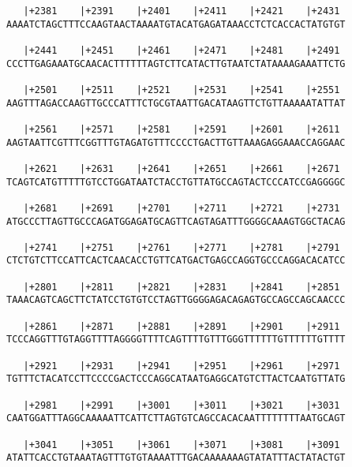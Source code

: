 \documentclass{article}
\begin{document}
\begin{Verbatim}
   |+2381    |+2391    |+2401    |+2411    |+2421    |+2431 
AAAATCTAGCTTTCCAAGTAACTAAAATGTACATGAGATAAACCTCTCACCACTATGTGT
                                                            
   |+2441    |+2451    |+2461    |+2471    |+2481    |+2491 
CCCTTGAGAAATGCAACACTTTTTTAGTCTTCATACTTGTAATCTATAAAAGAAATTCTG
                                                            
   |+2501    |+2511    |+2521    |+2531    |+2541    |+2551 
AAGTTTAGACCAAGTTGCCCATTTCTGCGTAATTGACATAAGTTCTGTTAAAAATATTAT
                                                            
   |+2561    |+2571    |+2581    |+2591    |+2601    |+2611 
AAGTAATTCGTTTCGGTTTGTAGATGTTTCCCCTGACTTGTTAAAGAGGAAACCAGGAAC
                                                            
   |+2621    |+2631    |+2641    |+2651    |+2661    |+2671 
TCAGTCATGTTTTTGTCCTGGATAATCTACCTGTTATGCCAGTACTCCCATCCGAGGGGC
                                                            
   |+2681    |+2691    |+2701    |+2711    |+2721    |+2731 
ATGCCCTTAGTTGCCCAGATGGAGATGCAGTTCAGTAGATTTGGGGCAAAGTGGCTACAG
                                                            
   |+2741    |+2751    |+2761    |+2771    |+2781    |+2791 
CTCTGTCTTCCATTCACTCAACACCTGTTCATGACTGAGCCAGGTGCCCAGGACACATCC
                                                            
   |+2801    |+2811    |+2821    |+2831    |+2841    |+2851 
TAAACAGTCAGCTTCTATCCTGTGTCCTAGTTGGGGAGACAGAGTGCCAGCCAGCAACCC
                                                            
   |+2861    |+2871    |+2881    |+2891    |+2901    |+2911 
TCCCAGGTTTGTAGGTTTTAGGGGTTTTCAGTTTTGTTTGGGTTTTTTGTTTTTTGTTTT
                                                            
   |+2921    |+2931    |+2941    |+2951    |+2961    |+2971 
TGTTTCTACATCCTTCCCCGACTCCCAGGCATAATGAGGCATGTCTTACTCAATGTTATG
                                                            
   |+2981    |+2991    |+3001    |+3011    |+3021    |+3031 
CAATGGATTTAGGCAAAAATTCATTCTTAGTGTCAGCCACACAATTTTTTTTAATGCAGT
                                                            
   |+3041    |+3051    |+3061    |+3071    |+3081    |+3091 
ATATTCACCTGTAAATAGTTTGTGTAAAATTTGACAAAAAAAGTATATTTACTATACTGT
                                                            

\end{Verbatim}
\end{document}
